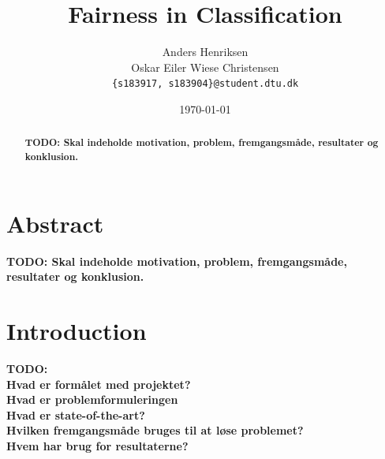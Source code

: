 \documentclass[11pt, fleqn, titlepage]{article}
\title{Fairness in Classification}
\author{Anders Henriksen \\ Oskar Eiler Wiese Christensen  \\ \texttt{\{s183917, s183904\}@student.dtu.dk}}
\date{\today}
\begin{document}
	
	\maketitle
	\begin{abstract}
		\textbf{TODO: Skal indeholde motivation, problem, fremgangsmåde, resultater og konklusion.} \\ \lipsum[1-2]
	\end{abstract}
	\tableofcontents \newpage
	
	\section{Abstract}
	\textbf{TODO: Skal indeholde motivation, problem, fremgangsmåde, resultater og konklusion.}
	
	\section{Introduction}
	\textbf{TODO: \\ Hvad er formålet med projektet? \\ Hvad er problemformuleringen \\ Hvad er state-of-the-art? \\ Hvilken fremgangsmåde bruges til at løse problemet? \\ Hvem har brug for resultaterne?}
	
\end{document}
